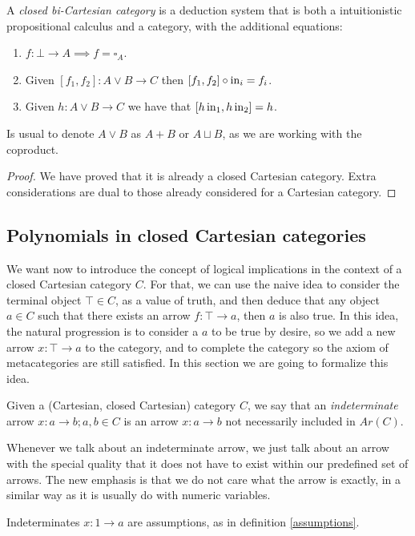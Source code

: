 \begin{proposition} A \emph{closed bi-Cartesian category} is a deduction system that is both a intuitionistic propositional calculus and a category, with the additional equations:
  \begin{enumerate}
  \item $f:\bot \to A \implies f=\square_A$.
  \item Given $[f_1,f_2] : A\lor B \to C$ then $ [f_1,f_2]\circ \operatorname{in}_i  = f_i$.
  \item Given $h:A\lor B\to C$ we have that $[ h\operatorname{in}_1, h\operatorname{in}_2] = h$.
  \end{enumerate}
\end{proposition}
\begin{remark}
  Is usual to denote $A\lor B$ as $A+B$ or $A\sqcup B$, as we are working with the coproduct.
\end{remark} 
\begin{proof}
  We have proved that it is already a closed Cartesian category. Extra considerations are dual to those already considered for a Cartesian category.
\end{proof}
\subsection{Polynomials in closed Cartesian categories}

We want now to introduce the concept of logical implications in the context of a closed Cartesian category $C$. For that, we can use the naive idea to consider the terminal object $\top \in C$, as a value of truth, and then deduce that any object $a\in C$ such that there exists an arrow $f:\top \to a$, then $a$ is also true. In this idea, the natural progression is to consider a $a$ to be true by desire, so we add a new arrow $x:\top \to a$ to the category, and to complete the category so the axiom of metacategories are still satisfied. In this section we are going to formalize this idea.
\begin{definition}
  Given a (Cartesian, closed Cartesian) category $C$, we say that an \emph{indeterminate} arrow $x: a \to b; a,b \in C$ is an arrow $x:a \to b$  not necessarily included in $Ar(C)$. 
\end{definition}
\begin{remark}\label{remark-indeterminates}
  Whenever we talk about an indeterminate arrow, we just talk about an arrow with the special quality that it does not have to exist within our predefined set of arrows. The new emphasis is that we do not care what the arrow is exactly, in a similar way as it is usually do with numeric variables. 
\end{remark}
\begin{remark}
  Indeterminates $x: 1\to a$ are assumptions, as in definition \ref{assumptions}.
\end{remark}

